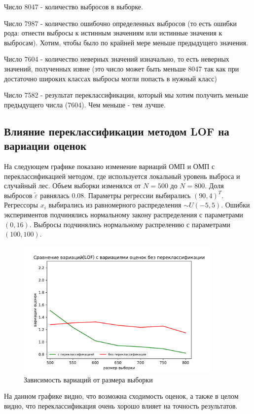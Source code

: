 Число 8047 - количество выбросов в выборке.

Число 7987 - количество ошибочно определенных выбросов (то есть ошибки рода: отнести выбросы к истинным значениям или истинные значения к выбросам). Хотим, чтобы было по крайней мере меньше предыдущего значения.

Число 7604 - количество неверных значений изначально, то есть неверных значений, полученных извне (это число может быть меньше 8047 так как при достаточно широких классах выбросы могли попасть в нужный класс)

Число 7582 - результат переклассификации, который мы хотим получить меньше предыдущего числа (7604). Чем меньше - тем лучше.


\subsection{Влияние переклассификации методом LOF на вариации оценок} \label{ss_4_9}
На следующем графике показано изменение вариаций ОМП и ОМП с переклассификацией методом, где используется локальный уровень выброса и случайный лес.
Объем выборки изменялся от $N=500$ до $N=800$. 
Доля выбросов $\widetilde{\varepsilon}$ равнялась $0.08$. 
Параметры регрессии выбирались $(90, 4)^T$. 
Регрессоры $x_i$ выбирались из равномерного распределения $\sim U(-5,5)$. 
Ошибки экспериментов подчинялись нормальному закону распределения с параметрами $(0, 16)$. Выбросы подчинялись нормальному распрелению с параметрами $(100, 100)$. 

\begin{figure}[hb]
    \centering
    \includegraphics[width=100mm]{../images/LOF_without(1).pdf}
    \caption{Зависимость вариаций от размера выборки\label{overflow}}
\end{figure}

На данном графике видно, что возможна сходимость оценок, а также в целом видно, что переклассификация очень хорошо влияет на точность результатов.

\newpage

\newpage

